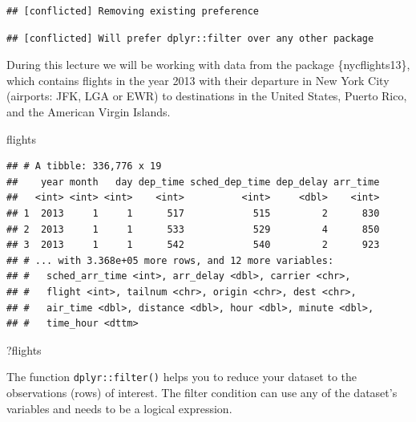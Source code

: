 \documentclass[]{book}
\newenvironment{Shaded}{}{}
\newcommand{\DecValTok}[1]{#1}
\newcommand{\KeywordTok}[1]{\textcolor[rgb]{0.00,0.00,1.00}{#1}}
\newcommand{\NormalTok}[1]{#1}
\newcommand{\OperatorTok}[1]{#1}
\newcommand{\StringTok}[1]{\textcolor[rgb]{0.00,0.50,0.50}{#1}}
\begin{document}
\begin{verbatim}
## [conflicted] Removing existing preference
\end{verbatim}

\begin{verbatim}
## [conflicted] Will prefer dplyr::filter over any other package
\end{verbatim}

During this lecture we will be working with data from the package \{nycflights13\}, which contains flights in the year 2013 with their departure in New York City (airports: JFK, LGA or EWR) to destinations in the United States, Puerto Rico, and the American Virgin Islands.

\begin{Shaded}
\begin{Highlighting}[]
\NormalTok{flights}
\end{Highlighting}
\end{Shaded}

\begin{verbatim}
## # A tibble: 336,776 x 19
##    year month   day dep_time sched_dep_time dep_delay arr_time
##   <int> <int> <int>    <int>          <int>     <dbl>    <int>
## 1  2013     1     1      517            515         2      830
## 2  2013     1     1      533            529         4      850
## 3  2013     1     1      542            540         2      923
## # ... with 3.368e+05 more rows, and 12 more variables:
## #   sched_arr_time <int>, arr_delay <dbl>, carrier <chr>,
## #   flight <int>, tailnum <chr>, origin <chr>, dest <chr>,
## #   air_time <dbl>, distance <dbl>, hour <dbl>, minute <dbl>,
## #   time_hour <dttm>
\end{verbatim}

\begin{Shaded}
\begin{Highlighting}[]
\NormalTok{?flights}
\end{Highlighting}
\end{Shaded}

The function \texttt{dplyr::filter()} helps you to reduce your dataset to the observations (rows) of interest.
The filter condition can use any of the dataset's variables and needs to be a logical expression.

\begin{Shaded}
\end{Shaded}
\end{document}
